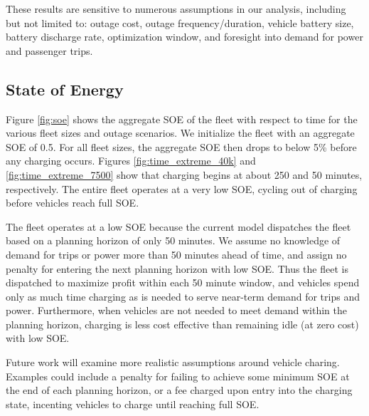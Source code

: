 \documentclass[journal]{IEEEtran}
\begin{document}
These results are sensitive to numerous assumptions in our analysis, including but not limited to: outage cost, outage frequency/duration, vehicle battery size, battery discharge rate, optimization window, and foresight into demand for power and passenger trips.

\subsection{State of Energy}
Figure \ref{fig:soe} shows the aggregate SOE of the fleet with respect to time for the various fleet sizes and outage scenarios. We initialize the fleet with an aggregate SOE of 0.5. For all fleet sizes, the aggregate SOE then drops to below 5\% before any charging occurs. Figures \ref{fig:time_extreme_40k} and \ref{fig:time_extreme_7500} show that charging begins at about 250 and 50 minutes, respectively. The entire fleet operates at a very low SOE, cycling out of charging before vehicles reach full SOE. 

The fleet operates at a low SOE because the current model dispatches the fleet based on a planning horizon of only 50 minutes. We assume no knowledge of demand for trips or power more than 50 minutes ahead of time, and assign no penalty for entering the next planning horizon with low SOE. Thus the fleet is dispatched to maximize profit within each 50 minute window, and vehicles spend only as much time charging as is needed to serve near-term demand for trips and power. Furthermore, when vehicles are not needed to meet demand within the planning horizon, charging is less cost effective than remaining idle (at zero cost) with low SOE.

Future work will examine more realistic assumptions around vehicle charing. Examples could include a penalty for failing to achieve some minimum SOE at the end of each planning horizon, or a fee charged upon entry into the charging state, incenting vehicles to charge until reaching full SOE.
\end{document}
